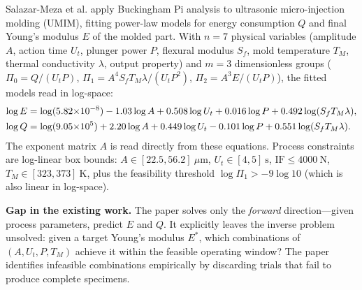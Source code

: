 \documentclass[review,onefignum,onetabnum]{./SIAM_template/siamart171218}
\begin{document}
Salazar-Meza et al. \cite{SalazarMeza2023} apply Buckingham Pi analysis to ultrasonic
micro-injection molding (UMIM), fitting power-law models for energy consumption $Q$
and final Young's modulus $E$ of the molded part.  With $n=7$ physical variables
(amplitude $A$, action time $U_t$, plunger power $P$, flexural modulus $S_f$, mold
temperature $T_M$, thermal conductivity $\lambda$, output property) and $m=3$
dimensionless groups ($\Pi_0 = Q/(U_t P)$, $\Pi_1 = A^4 S_f T_M \lambda / (U_t P^2)$,
$\Pi_2 = A^3 E / (U_t P)$), the fitted models read in log-space:
\begin{align}
	\log E & = \log(5.82{\times}10^{-8}) - 1.03\log A + 0.508\log U_t
	+ 0.016\log P + 0.492\log(S_f T_M \lambda), \notag                \\
	\log Q & = \log(9.05{\times}10^{5}) + 2.20\log A + 0.449\log U_t
	- 0.101\log P + 0.551\log(S_f T_M \lambda). \notag
\end{align}
The exponent matrix $A$ is read directly from these equations.  Process constraints
are log-linear box bounds: $A \in [22.5, 56.2]\ \mu\text{m}$,
$U_t \in [4, 5]\ \text{s}$, $\text{IF} \leq 4000\ \text{N}$,
$T_M \in [323, 373]\ \text{K}$, plus the feasibility threshold
$\log\Pi_1 > -9\log 10$ (which is also linear in log-space).

\textbf{Gap in the existing work.}
The paper solves only the \emph{forward} direction---given process parameters, predict
$E$ and $Q$.  It explicitly leaves the inverse problem unsolved: given a target Young's
modulus $E^*$, which combinations of $(A, U_t, P, T_M)$ achieve it within the feasible
operating window?  The paper identifies infeasible combinations empirically by
discarding trials that fail to produce complete specimens.
\end{document}
